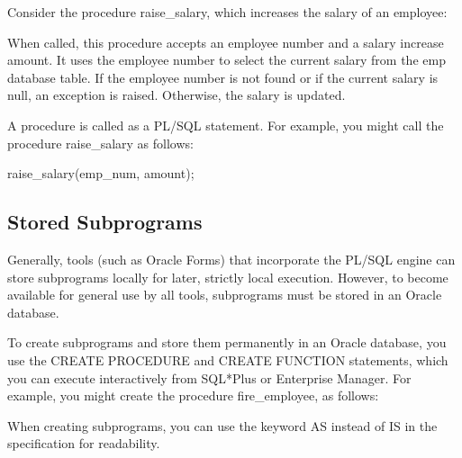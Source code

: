 Consider the procedure raise\_salary, which increases the salary of an employee:

When called, this procedure accepts an employee number and a salary increase amount. It uses the employee number to select the current salary from the emp database table. If the employee number is not found or if the current salary is null, an exception is raised. Otherwise, the salary is updated.

A procedure is called as a PL/SQL statement. For example, you might call the procedure raise\_salary as follows:

raise\_salary(emp\_num, amount);

\subsection{Stored Subprograms}
Generally, tools (such as Oracle Forms) that incorporate the PL/SQL engine can store subprograms locally for later, strictly local execution. However, to become available for general use by all tools, subprograms must be stored in an Oracle database.

To create subprograms and store them permanently in an Oracle database, you use the CREATE PROCEDURE and CREATE FUNCTION statements, which you can execute interactively from SQL*Plus or Enterprise Manager. For example, you might create the procedure fire\_employee, as follows:



When creating subprograms, you can use the keyword AS instead of IS in the specification for readability.


\clearpage